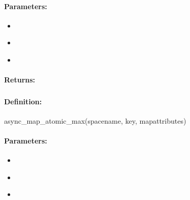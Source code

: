 \paragraph{Parameters:}
\begin{itemize}[noitemsep]
\item {}\\

\item {}\\

\item {}\\

\end{itemize}

\paragraph{Returns:}


\pagebreak
\subsubsection{}
\label{api:ruby:async_map_atomic_max}


\paragraph{Definition:}
\begin{rubycode}
async_map_atomic_max(spacename, key, mapattributes)
\end{rubycode}

\paragraph{Parameters:}
\begin{itemize}[noitemsep]
\item {}\\

\item {}\\

\item {}\\

\end{itemize}

